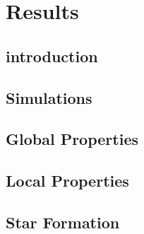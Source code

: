 \chapter{Results}
\label{ch:results}

\section{introduction}

\section{Simulations}

\section{Global Properties}

\section{Local Properties}

\section{Star Formation}